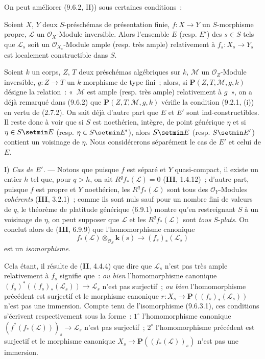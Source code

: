 On peut améliorer (9.6.2, II)) sous certaines conditions~:

\begin{proposition}[9.6.3]
\label{IV.9.6.3-fr}
Soient $X$, $Y$ deux $S$-préschémas de présentation finie, $f:X\to Y$ un
$S$-morphisme \textup{propre}, $\mathcal L$ un $\mathcal O_X$-Module inversible. Alors
l'ensemble $E$ \textup{(resp.} $E'$\textup{)} des $s\in S$ tels que $\mathcal L_s$ soit un
$\mathcal O_{X_s}$-Module ample \textup{(resp.} très ample\textup{)} relativement à
$f_s:X_s\to Y_s$ est localement constructible dans $S$.
\end{proposition}

Soient $k$ un corps, $Z$, $T$ deux préschémas algébriques sur $k$, $\mathcal M$
un $\mathcal O_Z$-Module inversible, $g:Z\to T$ un $k$-morphisme de type fini~;
alors, si $\boldsymbol{P}(Z,T,\mathcal M,g,k)$ désigne la relation~: «~$\mathcal M$ est ample
(resp. très ample) relativement à $g$~», on a déjà remarqué dans (9.6.2) que
$\boldsymbol{P}(Z,T,\mathcal M,g,k)$ vérifie la condition (9.2.1, (i)) en vertu de (2.7.2).
On sait déjà d'autre part que $E$ et $E'$ sont ind-constructibles. Il reste donc
à voir que si $S$ est noethérien, intègre, de point générique $\eta$ et si
$\eta\in S\setmin E$ (resp. $\eta\in S\setmin E'$), alors $S\setmin E$ (resp. $S\setmin E'$) contient un
voisinage de $\eta$. Nous considérerons séparément le cas de $E'$ et celui de
$E$.

I) \emph{Cas de $E'$.} --- Notons que puisque $f$ est séparé et $Y$
quasi-compact, il existe un entier $h$ tel que, pour $q>h$, on ait
$R^qf_*(\mathcal L)=0$ (\textbf{III}, 1.4.12)~; d'autre part, puisque $f$ est
propre et $Y$ noethérien, les $R^qf_*(\mathcal L)$ sont tous des
$\mathcal O_Y$-Modules \emph{cohérents} (\textbf{III}, 3.2.1)~; comme ils sont nuls
sauf pour un nombre fini de valeurs de $q$, le théorème de platitude générique
(6.9.1) montre qu'en restreignant $S$ à un voisinage de $\eta$, on peut
supposer que $\mathcal L$ et les $R^qf_*(\mathcal L)$ sont \emph{tous} $S$-\emph{plats}. On
conclut alors de (\textbf{III}, 6.9.9) que l'homomorphisme canonique
\begin{equation}
\label{IV.9.6.3.1-fr}
 f_*(\mathcal L)\otimes_{\mathcal O_S} \boldsymbol{k}(s)
 \longrightarrow (f_s)_*(\mathcal L_s)
 \tag{9.6.3.1}
\end{equation}
est un \emph{isomorphisme}.


Cela étant, il résulte de (\textbf{II}, 4.4.4) que dire que $\mathcal L_s$
n'est pas très ample relativement à $f_s$ signifie que~: \emph{ou bien}
l'homomorphisme canonique
$(f_s)^*((f_s)_*(\mathcal L_s))\to\mathcal L_s$ n'est pas surjectif~; \emph{ou
bien} l'homomorphisme précédent est surjectif et le morphisme canonique
$r:X_s\to\mathbf P((f_s)_*(\mathcal L_s))$ n'est pas une immersion. Compte
tenu de l'isomorphisme (9.6.3.1), ces conditions s'écrivent respectivement sous
la forme~: $1^\circ$ l'homomorphisme canonique
$(f^*(f_*(\mathcal L)))_s\to\mathcal L_s$ n'est pas surjectif~; $2^\circ$
l'homomorphisme précédent est surjectif et le morphisme canonique
$X_s\to\mathbf P((f_*(\mathcal L))_s)$ n'est pas une immersion.

